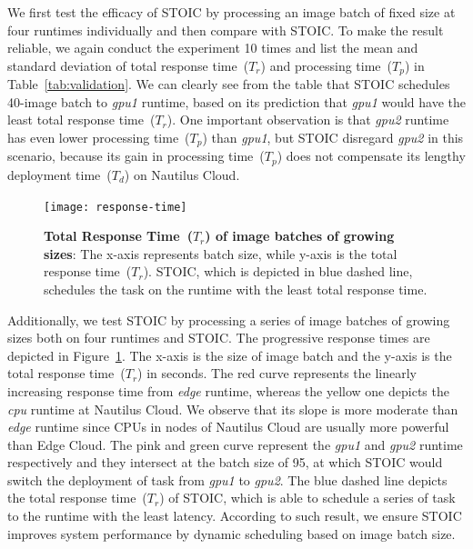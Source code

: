 We first test the efficacy of STOIC by processing an image batch of fixed size at four runtimes individually and then compare with STOIC. To make the result reliable, we again conduct the experiment 10 times and list the mean and standard deviation of total response time~($T_r$) and processing time~($T_p$) in Table~\ref{tab:validation}. We can clearly see from the table that STOIC schedules 40-image batch to \textit{gpu1} runtime, based on its prediction that  \textit{gpu1} would have the least total response time~($T_r$). One important observation is that \textit{gpu2} runtime has even lower processing time~($T_p$) than \textit{gpu1}, but STOIC disregard \textit{gpu2} in this scenario, because its gain in processing time~($T_p$) does not compensate its lengthy deployment time~($T_d$) on Nautilus Cloud.

\begin{figure}[t] \centering 
\texttt{[image: response-time]}
\caption{\textbf{Total Response Time~($T_r$) of image batches of growing sizes}: The x-axis represents batch size, while y-axis is the total response time~($T_r$). STOIC, which is depicted in blue dashed line, schedules the task on the runtime with the least total response time.  
\label{fig:response-time}}
\end{figure}

Additionally, we test STOIC by processing a series of image batches of growing sizes both on four runtimes and STOIC. The progressive response times are depicted in Figure~\ref{fig:response-time}. The x-axis is the size of image batch and the y-axis is the total response time~($T_r$) in seconds. The red curve represents the linearly increasing response time from \textit{edge} runtime, whereas the yellow one depicts the \textit{cpu} runtime at Nautilus Cloud. We observe that its slope is more moderate than \textit{edge} runtime since CPUs in nodes of Nautilus Cloud are usually more powerful than Edge Cloud. The pink and green curve represent the \textit{gpu1} and \textit{gpu2} runtime respectively and they intersect at the batch size of 95, at which STOIC would switch the deployment of task from \textit{gpu1} to \textit{gpu2}. The blue dashed line depicts the total response time~($T_r$) of STOIC, which is able to schedule a series of task to the runtime with the least latency. According to such result, we ensure STOIC improves system performance by dynamic scheduling based on image batch size.


